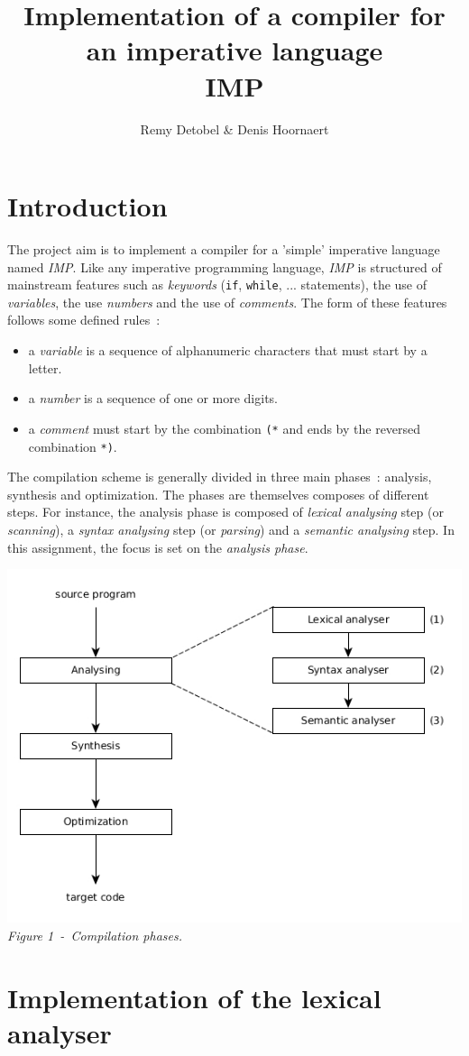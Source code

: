 \documentclass[a4paper,11pt]{article}
\title{Implementation of a compiler for an imperative language\\IMP}
\author{Remy Detobel \& Denis Hoornaert}
\begin{document}
\maketitle
\tableofcontents

\section{Introduction}

  The project aim is to implement a compiler for a 'simple' imperative language named \textit{IMP}. Like any imperative programming language, \textit{IMP} is structured of mainstream features such as \textit{keywords} (\verb|if|, \verb|while|, ... statements), the use of \textit{variables}, the use \textit{numbers} and the use of \textit{comments}.
  The form of these features follows some defined rules~:
  \begin{itemize}
    \item a \textit{variable} is a sequence of alphanumeric characters that must start by a letter.
    \item a \textit{number} is a sequence of one or more digits.
    \item a \textit{comment} must start by the combination \verb|(*| and ends by the reversed combination \verb|*)|.
  \end{itemize}
  The compilation scheme is generally divided in three main phases~: analysis, synthesis and optimization. The phases are themselves composes of different steps. For instance, the analysis phase is composed of \textit{lexical analysing} step (or \textit{scanning}), a \textit{syntax analysing} step (or \textit{parsing}) and a \textit{semantic analysing} step. In this assignment, the focus is set on the \textit{analysis phase}.
  \begin{center}
    \includegraphics[scale=0.3]{./img/phase_of_compiler.jpg}\\
    \textit{Figure 1~-~Compilation phases.}
  \end{center}
  
\section{Implementation of the lexical analyser}
\end{document}
